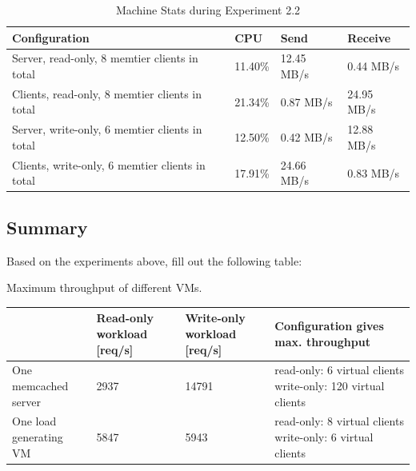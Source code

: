 \documentclass[11pt,a4paper]{article}
\begin{document}
\begin{center}
    \begin{table}
    	\begin{tabular}{|l|p{2cm}|p{2cm}|p{4cm}|}
            \hline \textbf{Configuration} & \textbf{CPU} & \textbf{Send} & \textbf{Receive}\\
            \hline Server, read-only, 8 memtier clients in total & 11.40\%         & 12.45 MB/s    & 0.44 MB/s\\
            \hline Clients, read-only, 8 memtier clients in total & 21.34\%           & 0.87 MB/s     & 24.95 MB/s\\
            \hline Server, write-only,  6 memtier clients in total & 12.50\%        & 0.42 MB/s     & 12.88 MB/s\\
            \hline Clients, write-only, 6 memtier clients in total & 17.91\%       & 24.66 MB/s     & 0.83 MB/s\\
            \hline
    	\end{tabular}
	\caption{Machine Stats during Experiment 2.2}
    \label{dstat:2-2}
	\end{table}
\end{center}



\subsection{Summary}

Based on the experiments above, fill out the following table:

\begin{center}
	{Maximum throughput of different VMs.}
	\begin{tabular}{|l|p{2cm}|p{2cm}|p{4cm}|}
		\hline                        & Read-only workload [req/s] & Write-only workload [req/s] & Configuration gives max. throughput \\ 
		\hline One memcached server   &          2937          &      14791               &            read-only: 6 virtual clients \newline write-only: 120 virtual clients                         \\ 
		\hline One load generating VM &        5847            &          5943           &         read-only: 8 virtual clients \newline write-only: 6 virtual clients                            \\ 
		\hline 
	\end{tabular}
\end{center}
\end{document}
